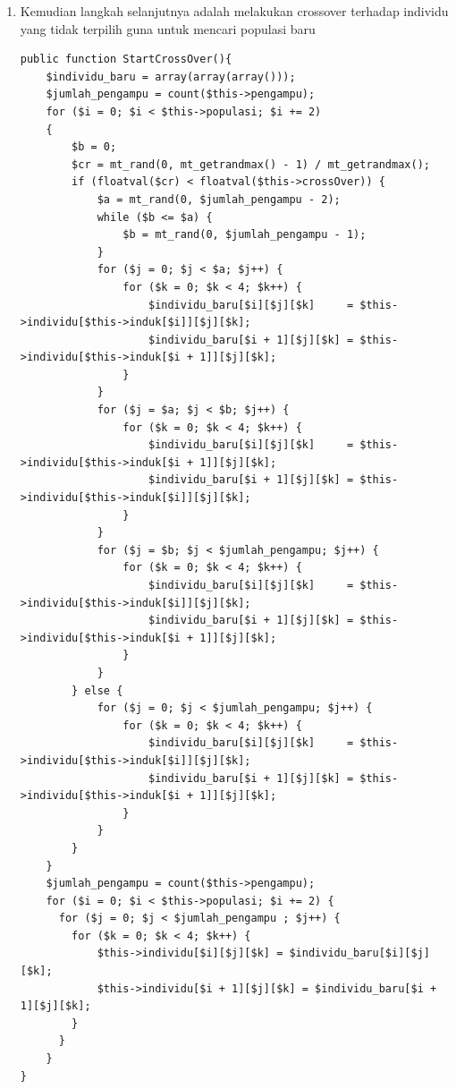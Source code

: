 \begin{enumerate}
\begin{enumerate}
	\item Kemudian langkah selanjutnya adalah melakukan crossover terhadap individu yang tidak terpilih guna untuk mencari populasi baru
\begin{lstlisting}
public function StartCrossOver(){
    $individu_baru = array(array(array()));
    $jumlah_pengampu = count($this->pengampu);
    for ($i = 0; $i < $this->populasi; $i += 2)
    {
        $b = 0;
        $cr = mt_rand(0, mt_getrandmax() - 1) / mt_getrandmax();
        if (floatval($cr) < floatval($this->crossOver)) {
            $a = mt_rand(0, $jumlah_pengampu - 2);
            while ($b <= $a) {
                $b = mt_rand(0, $jumlah_pengampu - 1);
            }
            for ($j = 0; $j < $a; $j++) {
                for ($k = 0; $k < 4; $k++) {                        
                    $individu_baru[$i][$j][$k]     = $this->individu[$this->induk[$i]][$j][$k];
                    $individu_baru[$i + 1][$j][$k] = $this->individu[$this->induk[$i + 1]][$j][$k];
                }
            }
            for ($j = $a; $j < $b; $j++) {
                for ($k = 0; $k < 4; $k++) {
                    $individu_baru[$i][$j][$k]     = $this->individu[$this->induk[$i + 1]][$j][$k];
                    $individu_baru[$i + 1][$j][$k] = $this->individu[$this->induk[$i]][$j][$k];
                }
            }
            for ($j = $b; $j < $jumlah_pengampu; $j++) {
                for ($k = 0; $k < 4; $k++) {
                    $individu_baru[$i][$j][$k]     = $this->individu[$this->induk[$i]][$j][$k];
                    $individu_baru[$i + 1][$j][$k] = $this->individu[$this->induk[$i + 1]][$j][$k];
                }
            }
        } else {
            for ($j = 0; $j < $jumlah_pengampu; $j++) {
                for ($k = 0; $k < 4; $k++) {
                    $individu_baru[$i][$j][$k]     = $this->individu[$this->induk[$i]][$j][$k];
                    $individu_baru[$i + 1][$j][$k] = $this->individu[$this->induk[$i + 1]][$j][$k];
                }
            }
        }
    }
    $jumlah_pengampu = count($this->pengampu);
    for ($i = 0; $i < $this->populasi; $i += 2) {
      for ($j = 0; $j < $jumlah_pengampu ; $j++) {
        for ($k = 0; $k < 4; $k++) {
            $this->individu[$i][$j][$k] = $individu_baru[$i][$j][$k];
            $this->individu[$i + 1][$j][$k] = $individu_baru[$i + 1][$j][$k];
        }
      }
    }
}
\end{lstlisting}
		

\end{enumerate}
\end{enumerate}
